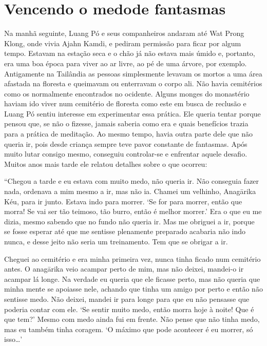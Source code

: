 \chapter[Vencendo o medo de fantasmas]{Vencendo o medo\newline de fantasmas}

Na manhã seguinte, Luang Pó e seus companheiros andaram até Wat Prong
Klong, onde vivia Ajahn Kamdi, e pediram permissão para ficar por algum
tempo. Estavam na estação seca e o chão já não estava mais úmido e,
portanto, era uma boa época para viver ao ar livre, ao pé de uma árvore,
por exemplo. Antigamente na Tailândia as pessoas simplesmente levavam os
mortos a uma área afastada na floresta e queimavam ou enterravam o corpo
ali. Não havia cemitérios como os normalmente encontrados no ocidente.
Alguns monges do monastério haviam ido viver num cemitério de floresta
como este em busca de reclusão e Luang Pó sentiu interesse em
experimentar essa prática. Ele queria tentar porque pensou que, se não o
fizesse, jamais saberia como era e quais benefícios trazia para a
prática de meditação. Ao mesmo tempo, havia outra parte dele que não
queria ir, pois desde criança sempre teve pavor constante de fantasmas.
Após muito lutar consigo mesmo, conseguiu controlar-se e enfrentar
aquele desafio. Muitos anos mais tarde ele relatou detalhes sobre o que
ocorreu:

``Chegou a tarde e eu estava com muito medo, não queria ir. Não
conseguia fazer nada, ordenava a mim mesmo a ir, mas não ia. Chamei um
velhinho, Anagārika Kéu, para ir junto. Estava indo para morrer. `Se for
para morrer, então que morra! Se vai ser tão teimoso, tão burro, então é
melhor morrer.' Era o que eu me dizia, mesmo sabendo que no fundo não
queria ir. Mas me obriguei a ir, porque se fosse esperar até que me
sentisse plenamente preparado acabaria não indo nunca, e desse jeito não
seria um treinamento. Tem que se obrigar a ir.

Cheguei ao cemitério e era minha primeira vez, nunca tinha ficado num
cemitério antes. O anagārika veio acampar perto de mim, mas não deixei,
mandei-o ir acampar lá longe. Na verdade eu queria que ele ficasse
perto, mas não queria que minha mente se apoiasse nele, achando que
tinha um amigo por perto e então não sentisse medo. Não deixei, mandei
ir para longe para que eu não pensasse que poderia contar com ele. `Se
sentir muito medo, então morra hoje à noite! Que é que tem?' Mesmo com
medo ainda fui em frente. Não pense que não tinha medo, mas eu também
tinha coragem. `O máximo que pode acontecer é eu morrer, só
isso\ldots{}'

